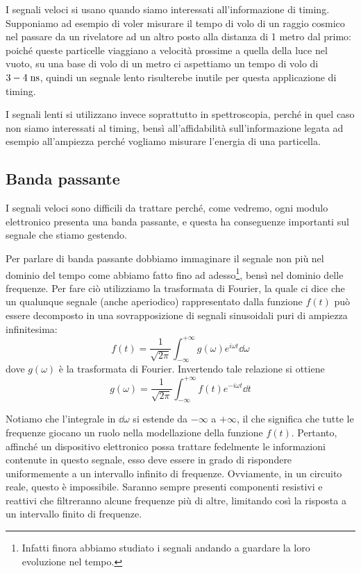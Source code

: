 
I segnali veloci si usano quando siamo interessati all'informazione di timing. Supponiamo ad esempio di voler misurare il tempo di volo di un raggio cosmico nel passare da un rivelatore ad un altro posto alla distanza di 1 metro dal primo: poiché queste particelle viaggiano a velocità prossime a quella della luce nel vuoto, su una base di volo di un metro ci aspettiamo un tempo di volo di $3-4 \; \rm ns$, quindi un segnale lento risulterebe inutile per questa applicazione di timing.

I segnali lenti si utilizzano invece soprattutto in spettroscopia, perché in quel caso non siamo interessati al timing, bensì all'affidabilità sull'informazione legata ad esempio all'ampiezza perché vogliamo misurare l'energia di una particella.

\subsection{Banda passante}
I segnali veloci sono difficili da trattare perché, come vedremo, ogni modulo elettronico presenta una banda passante, e questa ha conseguenze importanti sul segnale che stiamo gestendo.

Per parlare di banda passante dobbiamo immaginare il segnale non più nel dominio del tempo come abbiamo fatto fino ad adesso\footnote{Infatti finora abbiamo studiato i segnali andando a guardare la loro evoluzione nel tempo.}, bensì nel dominio delle frequenze. Per fare ciò utilizziamo la trasformata di Fourier, la quale ci dice che un qualunque segnale (anche aperiodico) rappresentato dalla funzione $f(t)$ può essere decomposto in una sovrapposizione di segnali sinusoidali puri di ampiezza infinitesima:
\begin{equation*}
   f(t)=\frac{1}{\sqrt{2\pi}} \int_{-\infty}^{+\infty} g(\omega) e^{i \omega t} \dd{\omega}
\end{equation*}
dove $g(\omega)$ è la trasformata di Fourier. Invertendo tale relazione si ottiene
\begin{equation*}
   g(\omega)=\frac{1}{\sqrt{2\pi}} \int_{-\infty}^{+\infty} f(t) e^{-i \omega t} \dd{t}
\end{equation*}

Notiamo che l'integrale in $\dd{\omega}$ si estende da $-\infty$ a $+\infty$, il che significa che tutte le frequenze giocano un ruolo nella modellazione della funzione $f(t)$. Pertanto, affinché un dispositivo elettronico possa trattare fedelmente le informazioni contenute in questo segnale, esso deve essere in grado di rispondere uniformemente a un intervallo infinito di frequenze. Ovviamente, in un circuito reale, questo è impossibile. Saranno sempre presenti componenti resistivi e reattivi che filtreranno alcune frequenze più di altre, limitando così la risposta a un intervallo finito di frequenze.

